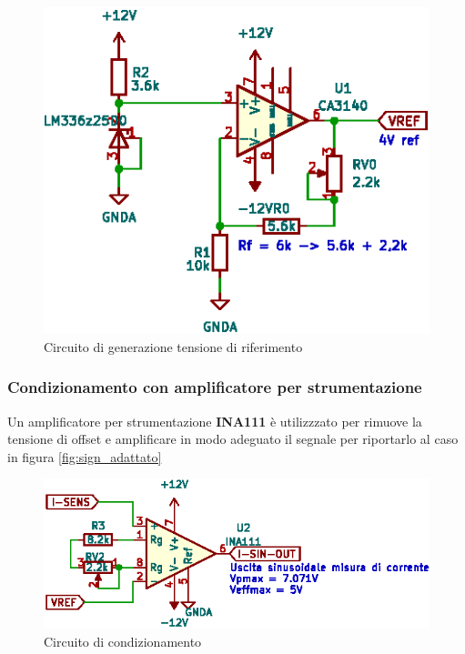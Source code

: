 \begin{figure}[H]
    \centering
    \includegraphics[scale=1.5]{corrente/ref.eps}
    \caption{Circuito di generazione tensione di riferimento}
\end{figure}

\subsubsection{Condizionamento con amplificatore per strumentazione}
Un amplificatore per strumentazione \textbf{INA111} è utilizzzato per rimuove la
tensione di offset e amplificare in modo adeguato il segnale per riportarlo al
caso in figura \ref{fig:sign_adattato}

\begin{figure}[H]
    \centering
    \includegraphics[scale=1.5]{corrente/ina.eps}
    \caption{Circuito di condizionamento}
\end{figure}

